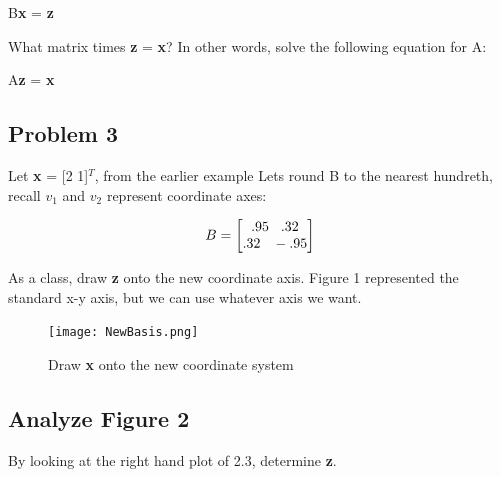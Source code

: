 \documentclass[11pt]{article}
\begin{document}
\begin{center}

B\textbf{x} = \textbf{z}

\end{center}

\vspace{10mm}
What matrix times \textbf{z} = \textbf{x}? In other words, solve the following equation for A:

\begin{center}
A\textbf{z} = \textbf{x}

\end{center}

\subsection{Problem 3}
Let \textbf{x} = [2 1]$^T$, from the earlier example\newline
Lets round B to the nearest hundreth, recall $v_1$ and $v_2$ represent coordinate axes:

\begin{center}



\[
B =
\begin{bmatrix}

.95  \hspace{3mm} .32 \\
.32  \hspace{3mm} -.95

\end{bmatrix}
\]

\vspace{3mm}

As a class, draw \textbf{z} onto the new coordinate axis. Figure 1 represented the standard x-y axis, but we can use whatever axis we want.


\begin{figure}[h]
\centering
\texttt{[image: NewBasis.png]}
\caption {Draw \textbf{x} onto the new coordinate system}
\end{figure}


\end{center}


\newpage


\subsection{Analyze Figure 2}
By looking at the right hand plot of 2.3, determine \textbf{z}.


\vspace{5mm}
\end{document}
